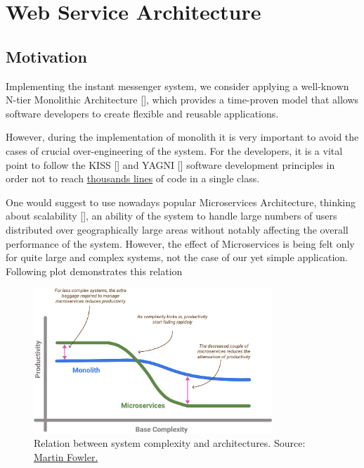 \section{Web Service Architecture}\label{sec:web-service-architecture}

\subsection{Motivation}\label{subsec:motivation}
Implementing the instant messenger system, we consider applying a well-known N-tier
Monolithic Architecture [\cite{bucchiarone2018monolithic}], which provides a time-proven model that allows software
developers to create flexible and reusable applications.

However, during the implementation of monolith it is very important to avoid the cases of crucial over-engineering
of the system.
For the developers, it is a vital point to follow the KISS [\cite{alwin2016kiss}] and YAGNI [\cite{da2018evolution}]
software development principles in order not to reach
\href{https://github.com/smartstore/SmartStoreNET/blob/4.x/src/Presentation/SmartStore.Web/Controllers/CatalogHelper.cs}
{thousands lines}
of code in a single class.

One would suggest to use nowadays popular Microservices Architecture, thinking about scalability [\cite{brataas2004exploring}],
an ability of the system to handle large numbers of users distributed over geographically large areas without
notably affecting the overall performance of the system.
However, the effect of Microservices is being felt only for quite large and complex systems,
not the case of our yet simple application.
Following plot demonstrates this relation

\begin{figure}[H]
    \centering
    \includegraphics[width=0.8\textwidth]{Pictures/Monolith_vs_Microservice.pdf}
    \caption{Relation between system complexity and architectures.
    Source: \href{https://martinfowler.com/bliki/MicroservicePremium.html}{Martin Fowler.}}
    \label{fig:monolith_vs_microservice}
\end{figure}

